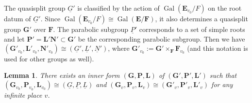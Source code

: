 \documentclass[a4paper]{amsart}
\numberwithin{equation}{section}
\newtheorem{lem}[thm]{Lemma}
\theoremstyle{remark}
\theoremstyle{definition}
\DeclareMathOperator{\Gal}{Gal}
\newcommand{\alggrp}[1]{\underline{#1}}
\newcommand{\glob}[1]{\boldsymbol{#1}}
\renewcommand{\simeq}{\cong}
\begin{document}
The quasisplit group $\alggrp{G}'$ is classified by the action of $\Gal(\glob{E}_{v_{0}}/F)$ on the root datum of $\alggrp{G}'$.
Since $\Gal(\glob{E}_{v_{0}}/F)\simeq \Gal(\glob{E}/\glob{F})$, it also determines a quasisplit group $\glob{G}'$ over $\glob{F}$.
The parabolic subgroup $\alggrp{P}'$ corresponds to a set of simple roots and let $\glob{P}' = \glob{L}'\glob{N}'\subset\glob{G}'$ be the corresponding parabolic subgroup. Then we have $(\glob{G}'_{v_{0}},\glob{L}'_{v_{0}},\glob{N}'_{v_{0}})\simeq (\alggrp{G}',\alggrp{L}',\alggrp{N}')$, where $\glob{G}'_{v_{0}} := \glob{G'}\times_{\glob{F}}\glob{F}_{v_{0}}$ (and this notation is used for other groups as well).

\begin{lem}
There exists an inner form $(\glob{G},\glob{P},\glob{L})$ of $(\glob{G}',\glob{P}',\glob{L}')$ such that $(\glob{G}_{v_{0}},\glob{P}_{v_{0}},\glob{L}_{v_{0}})\simeq (\alggrp{G},\alggrp{P},\alggrp{L})$ and $(\glob{G}_{v},\glob{P}_{v},\glob{L}_{v})\simeq (\glob{G}'_{v},\glob{P}'_{v},\glob{L}'_{v})$ for any infinite place $v$.
\end{lem}
\end{document}
